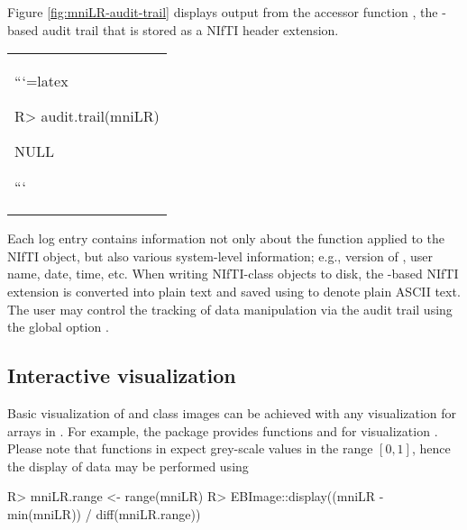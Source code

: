 \documentclass[
]{jss}
\begin{document}
Figure \ref{fig:mniLR-audit-trail} displays output from the accessor
function , the -based audit trail
that is stored as a NIfTI header extension.

\begin{sidewaysfigure}
  \centering
  \begin{tabular}{p{22cm}}
```{=latex}
\begin{CodeChunk}

\begin{CodeInput}
R> audit.trail(mniLR)
\end{CodeInput}

\begin{CodeOutput}
NULL
\end{CodeOutput}
\end{CodeChunk}
```
  \end{tabular}
  \caption{-based audit trail obtained via
    .  Note, this function will return
     if the  package is not available.}
  \label{fig:mniLR-audit-trail}
\end{sidewaysfigure}

Each log entry contains information not only about the function applied
to the NIfTI object, but also various system-level information; e.g.,
version of , user name, date, time, etc. When writing
NIfTI-class objects to disk, the -based NIfTI extension is
converted into plain text and saved using  to denote plain
ASCII text. The user may control the tracking of data manipulation via
the audit trail using the global option .

\subsection{Interactive visualization}

Basic visualization of  and  class images can be
achieved with any visualization for arrays in . For example,
the  package provides functions  and
 for visualization \citep{EBImage}. Please note that
functions in  expect grey-scale values in the range
\([0,1]\), hence the display of  data may be performed using

\begin{CodeChunk}

\begin{CodeInput}
R> mniLR.range <- range(mniLR)
R> EBImage::display((mniLR - min(mniLR)) / diff(mniLR.range))
\end{CodeInput}
\end{CodeChunk}
\end{document}
